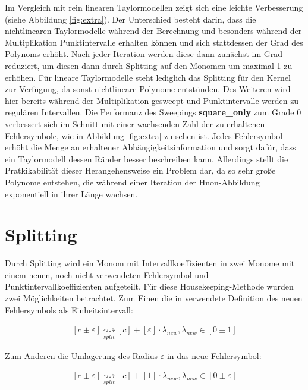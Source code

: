 Im Vergleich mit rein linearen Taylormodellen zeigt sich eine leichte Verbesserung (siehe Abbildung \ref{fig:extra}). Der Unterschied besteht darin, dass die nichtlinearen Taylormodelle während der Berechnung und besonders während der Multiplikation Punktintervalle erhalten können und sich stattdessen der Grad des Polynoms erhöht. Nach jeder Iteration werden diese dann zunächst im Grad reduziert, um diesen dann durch Splitting auf den Monomen um maximal 1 zu erhöhen. Für lineare Taylormodelle steht lediglich das Splitting für den Kernel zur Verfügung, da sonst nichtlineare Polynome entstünden. Des Weiteren wird hier bereits während der Multiplikation gesweept und Punktintervalle werden zu regulären Intervallen. Die Performanz des Sweepings \textbf{square\_only} zum Grade 0 verbessert sich im Schnitt mit einer wachsenden Zahl der zu erhaltenen Fehlersymbole, wie in Abbildung \ref{fig:extra} zu sehen ist. Jedes Fehlersymbol erhöht die Menge an erhaltener Abhängigkeitsinformation und sorgt dafür, dass ein Taylormodell dessen Ränder besser beschreiben kann. Allerdings stellt die Pratkikabilität dieser Herangehensweise ein Problem dar, da so sehr große Polynome entstehen, die während einer Iteration der H\e non-Abbildung exponentiell in ihrer Länge wachsen.
 


 \section{Splitting}
 Durch Splitting wird ein Monom mit Intervallkoeffizienten in zwei Monome mit einem neuen, noch nicht verwendeten Fehlersymbol und Punktintervallkoeffizienten aufgeteilt. Für diese Housekeeping-Methode wurden zwei Möglichkeiten betrachtet. Zum Einen die in \cite{DBLP:conf/macis/BrausseKM15} verwendete Definition des neuen Fehlersymbols als Einheitsintervall:
 
\begin{align}
\label{int:unit}
 [c \pm \varepsilon]  \underset{split}{\rightsquigarrow} [c] + [\varepsilon] \cdot \lambda_{new}, \lambda_{new} \in [0 \pm 1]
\end{align}

Zum Anderen die Umlagerung des Radius $\varepsilon$ in das neue Fehlersymbol:

\begin{align}
\label{int:nunit}
 [c \pm \varepsilon]  \underset{split}{\rightsquigarrow} [c] + [1] \cdot \lambda_{new}, \lambda_{new} \in [0 \pm \varepsilon]
\end{align}
 
